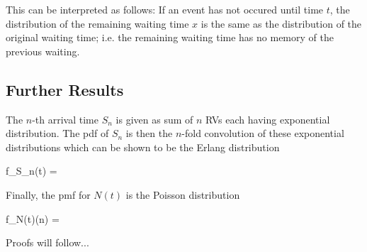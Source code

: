 This can be interpreted as follows: If an event has not occured until time $t$, the distribution of the remaining waiting time $x$ is the same as the distribution of the original waiting time; i.e. the remaining waiting time has no memory of the previous waiting.

\subsection{Further Results}

The $n$-th arrival time $S_n$ is given as sum of $n$ RVs each having exponential distribution. The pdf of $S_n$ is then the $n$-fold convolution of these exponential distributions which can be shown to be the Erlang distribution

\bee
f_{S_n}(t) = 
\eee

Finally, the pmf for $N(t)$ is the Poisson distribution

\bee
f_{N(t)}(n) = 
\eee

Proofs will follow...


